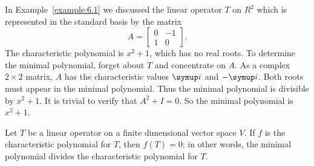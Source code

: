 \begin{example}
    In Example~\ref{example:6.1} we discussed the linear operator \(T\) on \(R^2\) which is represented in the standard basis by the matrix
    \begin{equation*}
        A=
        \begin{bmatrix}
            0 & -1 \\
            1 & 0
        \end{bmatrix}
        .
    \end{equation*}
    The characteristic polynomial is \(x^2+1\), which has no real roots. To determine the minimal polynomial, forget about \(T\) and concentrate on \(A\). As a complex \(2\times2\) matrix, \(A\) has the characteristic values \(\iu\) and \(-\iu\). Both roots must appear in the minimal polynomial. Thus the minimal polynomial is divisible by \(x^2+1\). It is trivial to verify that \(A^2+I=0\). So the minimal polynomial is \(x^2+1\).
\end{example}

\begin{theorem}
    Let \(T\) be a linear operator on a finite dimensional vector space \(V\). If \(f\) is the characteristic polynomial for \(T\), then \(f\left(T\right)=0\); in other words, the minimal polynomial divides the characteristic polynomial for \(T\).
\end{theorem}

